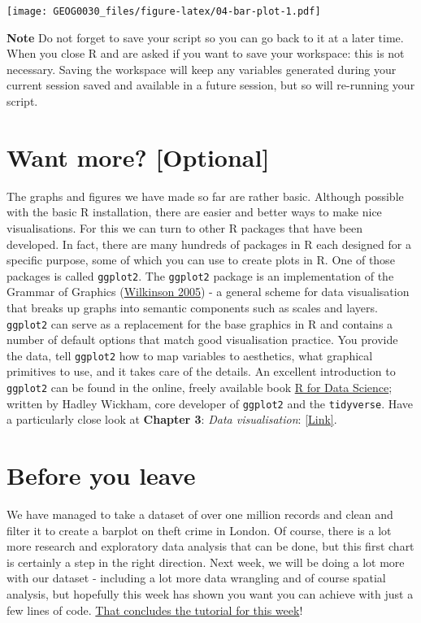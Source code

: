 \documentclass[
]{book}
\begin{document}
\texttt{[image: GEOG0030\_files/figure-latex/04-bar-plot-1.pdf]}

\textbf{Note}
Do not forget to save your script so you can go back to it at a later time. When you close R and are asked if you want to save your workspace: this is not necessary. Saving the workspace will keep any variables generated during your current session saved and available in a future session, but so will re-running your script.

\hypertarget{wm-w04}{%
\section{Want more? {[}Optional{]}}\label{wm-w04}}

The graphs and figures we have made so far are rather basic. Although possible with the basic R installation, there are easier and better ways to make nice visualisations. For this we can turn to other R packages that have been developed. In fact, there are many hundreds of packages in R each designed for a specific purpose, some of which you can use to create plots in R. One of those packages is called \texttt{ggplot2}. The \texttt{ggplot2} package is an implementation of the Grammar of Graphics (\href{https://en.wikipedia.org/wiki/Leland_Wilkinson}{Wilkinson 2005}) - a general scheme for data visualisation that breaks up graphs into semantic components such as scales and layers. \texttt{ggplot2} can serve as a replacement for the base graphics in R and contains a number of default options that match good visualisation practice. You provide the data, tell \texttt{ggplot2} how to map variables to aesthetics, what graphical primitives to use, and it takes care of the details. An excellent introduction to \texttt{ggplot2} can be found in the online, freely available book \href{https://r4ds.had.co.nz/data-visualisation.html}{R for Data Science}; written by Hadley Wickham, core developer of \texttt{ggplot2} and the \texttt{tidyverse}. Have a particularly close look at \textbf{Chapter 3}: \emph{Data visualisation}: \href{https://r4ds.had.co.nz/data-visualisation.html}{{[}Link{]}}.

\hypertarget{byl-w04}{%
\section{Before you leave}\label{byl-w04}}

We have managed to take a dataset of over one million records and clean and filter it to create a barplot on theft crime in London. Of course, there is a lot more research and exploratory data analysis that can be done, but this first chart is certainly a step in the right direction. Next week, we will be doing a lot more with our dataset - including a lot more data wrangling and of course spatial analysis, but hopefully this week has shown you want you can achieve with just a few lines of code. \href{https://www.youtube.com/watch?v=NKyYr2pbXUM}{That concludes the tutorial for this week}!
\end{document}
